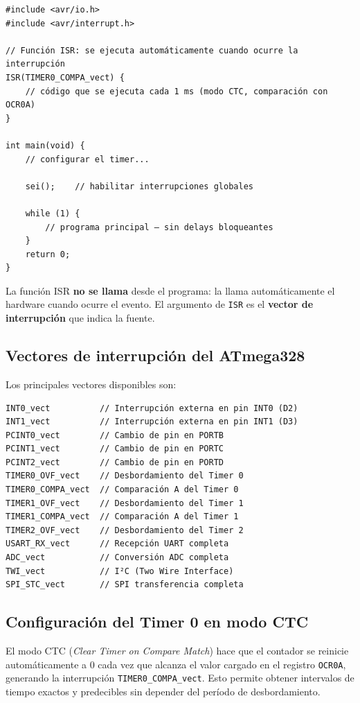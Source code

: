 \begin{lstlisting}[style=estilo-c]
#include <avr/io.h>
#include <avr/interrupt.h>

// Función ISR: se ejecuta automáticamente cuando ocurre la interrupción
ISR(TIMER0_COMPA_vect) {
    // código que se ejecuta cada 1 ms (modo CTC, comparación con OCR0A)
}

int main(void) {
    // configurar el timer...

    sei();    // habilitar interrupciones globales

    while (1) {
        // programa principal — sin delays bloqueantes
    }
    return 0;
}
\end{lstlisting}

La función ISR \textbf{no se llama} desde el programa: la llama automáticamente el
hardware cuando ocurre el evento. El argumento de \texttt{ISR} es el \textbf{vector
de interrupción} que indica la fuente.

\subsection{Vectores de interrupción del ATmega328}

Los principales vectores disponibles son:

\begin{lstlisting}[style=estilo-c]
INT0_vect          // Interrupción externa en pin INT0 (D2)
INT1_vect          // Interrupción externa en pin INT1 (D3)
PCINT0_vect        // Cambio de pin en PORTB
PCINT1_vect        // Cambio de pin en PORTC
PCINT2_vect        // Cambio de pin en PORTD
TIMER0_OVF_vect    // Desbordamiento del Timer 0
TIMER0_COMPA_vect  // Comparación A del Timer 0
TIMER1_OVF_vect    // Desbordamiento del Timer 1
TIMER1_COMPA_vect  // Comparación A del Timer 1
TIMER2_OVF_vect    // Desbordamiento del Timer 2
USART_RX_vect      // Recepción UART completa
ADC_vect           // Conversión ADC completa
TWI_vect           // I²C (Two Wire Interface)
SPI_STC_vect       // SPI transferencia completa
\end{lstlisting}

\subsection{Configuración del Timer 0 en modo CTC}

El modo CTC (\textit{Clear Timer on Compare Match}) hace que el contador se reinicie
automáticamente a 0 cada vez que alcanza el valor cargado en el registro
\texttt{OCR0A}, generando la interrupción \texttt{TIMER0\_COMPA\_vect}. Esto permite
obtener intervalos de tiempo exactos y predecibles sin depender del período de
desbordamiento.

